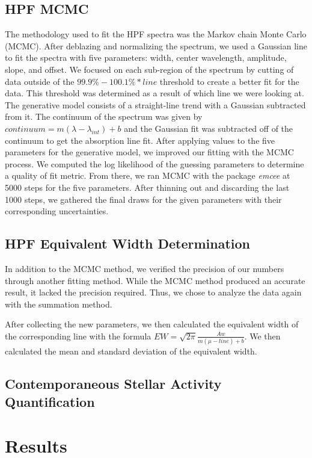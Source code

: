\documentclass[twocolumn]{aastex631}
\begin{document}
\subsection{HPF MCMC}
The methodology used to fit the HPF spectra was the Markov chain Monte Carlo (MCMC). After deblazing and normalizing the spectrum, we used a Gaussian line to fit the spectra with five parameters: width, center wavelength, amplitude, slope, and offset.  We focused on each sub-region of the spectrum by cutting of data outside of the $99.9\%-100.1\%*line$ threshold to create a better fit for the data. This threshold was determined as a result of which line we were looking at. The generative model consists of a straight-line trend with a Gaussian subtracted from it. The continuum of the spectrum was given by $continuum=m(\lambda-\lambda_{int})+b$ and the Gaussian fit was subtracted off of the continuum to get the absorption line fit. After applying values to the five parameters for the generative model, we improved our fitting with the MCMC process. We computed the log likelihood of the guessing parameters to determine a quality of fit metric. From there, we ran MCMC with the package \textit{emcee} at 5000 steps for the five parameters. After thinning out and discarding the last 1000 steps, we gathered the final draws for the given parameters with their corresponding uncertainties.

\subsection{HPF Equivalent Width Determination}
In addition to the MCMC method, we verified the precision of our numbers through another fitting method. While the MCMC method produced an accurate result, it lacked the precision required. Thus, we chose to analyze the data again with the summation method.

After collecting the new parameters, we then calculated the equivalent width of the corresponding line with the formula $EW=\sqrt{2\pi}\frac{Aw}{m(\mu-line)+b}$. We then calculated the mean and standard deviation of the equivalent width.
\subsection{Contemporaneous Stellar Activity Quantification}



\section{Results}
\end{document}
